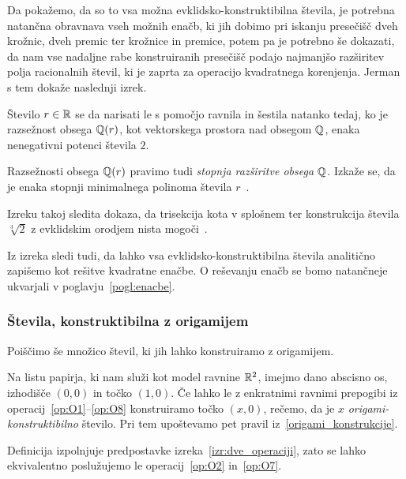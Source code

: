 Da pokažemo, da so to vsa možna evklidsko-konstruktibilna števila, je potrebna natančna obravnava vseh možnih enačb, ki jih dobimo pri iskanju presečišč dveh krožnic, dveh premic ter krožnice in premice, potem pa je potrebno še dokazati, da nam vse nadaljne rabe konstruiranih presečišč podajo najmanjšo razširitev polja racionalnih števil, ki je zaprta za operacijo kvadratnega korenjenja. Jerman s tem dokaže naslednji izrek.

\begin{izrek}
    \label{izr:evkl_konstr}
    Število $r \in \mathbb R$ se da narisati le s pomočjo ravnila in šestila natanko tedaj, ko je razsežnost obsega $\mathbb Q(r)$, kot vektorskega prostora nad obsegom $\mathbb Q$, enaka nenegativni potenci števila $2$.
\end{izrek}

\begin{opomba}
    Razsežnosti obsega $\mathbb Q(r)$ pravimo tudi \emph{stopnja razširitve obsega $\mathbb Q$}. Izkaže se, da je enaka stopnji minimalnega polinoma števila $r$~\cite[str.\ 77]{jerman1998}.
\end{opomba}

Izreku takoj sledita dokaza, da trisekcija kota v splošnem ter konstrukcija števila $ \sqrt[3]{2} $ z evklidskim orodjem nista mogoči~\cite[str.\ 77--78]{jerman1998}.

Iz izreka sledi tudi, da lahko vsa evklidsko-konstruktibilna števila analitično zapišemo kot rešitve kvadratne enačbe. O reševanju enačb se bomo natančneje ukvarjali v poglavju~\ref{pogl:enacbe}.

\subsubsection{Števila, konstruktibilna z origamijem}
\label{origami_konstruktibilnost}

Poiščimo še množico števil, ki jih lahko konstruiramo z origamijem.

\begin{definicija}
    Na listu papirja, ki nam služi kot model ravnine $\mathbb R^2$, imejmo dano abscisno os, izhodišče $(0,0)$ in točko $(1,0)$. Če lahko le z enkratnimi ravnimi prepogibi iz operacij~\ref{op:O1}--\ref{op:O8} konstruiramo točko $(x,0)$, rečemo, da je $x$ \emph{origami-konstruktibilno} število. Pri tem upoštevamo pet pravil iz~\ref{origami_konstrukcije}.
\end{definicija}

\begin{opomba}
    Definicija izpolnjuje predpostavke izreka~\ref{izr:dve_operaciji}, zato se lahko ekvivalentno poslužujemo le operacij~\ref{op:O2} in~\ref{op:O7}.
\end{opomba}

